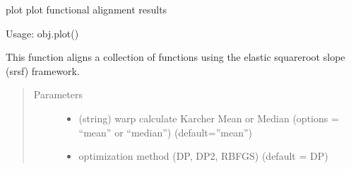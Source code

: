 \documentclass[letterpaper,10pt,english]{sphinxmanual}
\begin{document}
\begin{fulllineitems}
\begin{fulllineitems}
\begin{quote}
\begin{description}
\begin{itemize}
\end{itemize}

\end{description}\end{quote}

\end{fulllineitems}


\begin{fulllineitems}
\label{\detokenize{time_warping:time_warping.fdawarp.plot}}
plot plot functional alignment results

Usage: obj.plot()

\end{fulllineitems}


\begin{fulllineitems}
\label{\detokenize{time_warping:time_warping.fdawarp.srsf_align}}
This function aligns a collection of functions using the elastic
square\sphinxhyphen{}root slope (srsf) framework.
\begin{quote}\begin{description}
\item[{Parameters}] \leavevmode\begin{itemize}
\item {} 
 \textendash{} (string) warp calculate Karcher Mean or Median (options = “mean” or “median”) (default=”mean”)

\item {} 
 \textendash{} optimization method (DP, DP2, RBFGS) (default = DP)


\end{itemize}
\end{description}
\end{quote}
\end{fulllineitems}
\end{fulllineitems}
\end{document}
